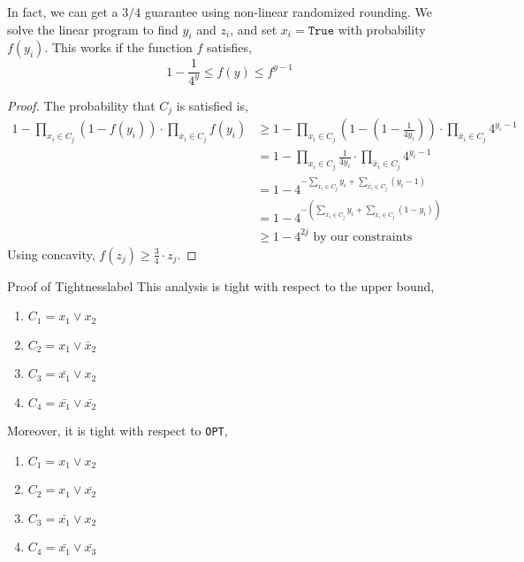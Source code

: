 \begin{rmk}
	In fact, we can get a $3/4$ guarantee using non-linear randomized rounding. We solve the linear program to find $y_i$ and $z_i$, and set $x_i = \texttt{True}$ with probability $f(y_i)$. This works if the function $f$ satisfies,
	\[1 - \frac{1}{4^y} \leq f(y) \leq f^{y-1}\]
\end{rmk}

\begin{proof}
	The probability that $C_j$ is satisfied is,
	\begin{align*}
	1-\prod_{x_{i} \in C_{j}}\left(1-f\left(y_{i}\right)\right) \cdot \prod_{\bar{x}_{i} \in C_{j}} f\left(y_{i}\right)
	&\geq 1-\prod_{x_{i} \in C_{j}}\left(1-\left(1-\frac{1}{4 y_{i}}\right)\right) \cdot \prod_{\bar{x}_{i} \in C_{j}} 4^{y_{i}-1} \\
	&=1-\prod_{x_{i} \in C_{j}} \frac{1}{4 y_{i}} \cdot \prod_{\bar{x}_{i} \in C_{j}} 4^{y_{i}-1}\\
	&=1-4^{-\sum_{x_{i} \in C_{j}} y_{i}+\sum_{\bar{x}_{i} \in C_{j}}\left(y_{i}-1\right)}\\
	&=1-4^{-\left(\sum_{x_{i} \in C_{j}} y_{i}+\sum_{\bar{x}_{i} \in C_{j}}\left(1-y_{i}\right)\right)}\\
	&\geq 1 - 4^{2j} \text{ by our constraints}
	\end{align*}
	\noindent Using concavity, $f(z_j) \geq \frac{3}{4} \cdot z_j$.
\end{proof}

\begin{ex}{Proof of Tightness}{label}
	This analysis is tight with respect to the upper bound,
	\begin{enumerate}
		\item $C_1 = x_1 \lor x_2$
		\item $C_2 = x_1 \lor \bar{x}_2$
		\item $C_3 = \bar{x_1} \lor x_2$
		\item $C_4 = \bar{x_1} \lor \bar{x_2}$
	\end{enumerate}

	Moreover, it is tight with respect to \texttt{OPT},
	\begin{enumerate}
		\item $C_1 = x_1 \lor x_2$
		\item $C_2 = x_1 \lor \bar{x_2}$
		\item $C_3 = \bar{x_1} \lor x_2$
		\item $C_4 = \bar{x_1} \lor \bar{x_3}$
	\end{enumerate}
\end{ex}

